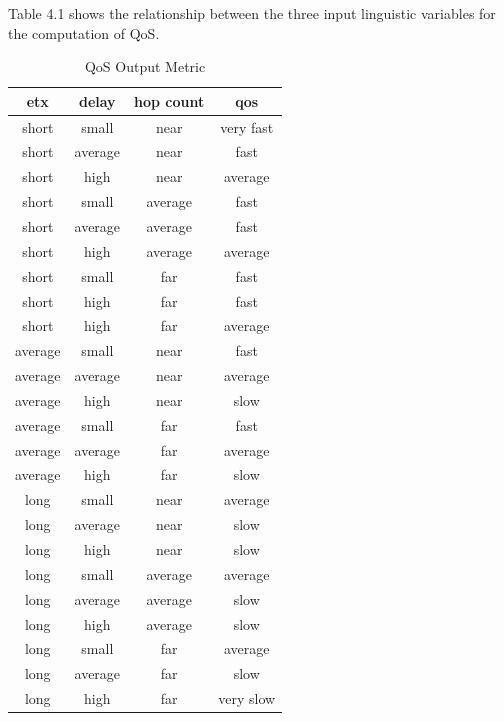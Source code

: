 \noindent Table 4.1 shows the relationship between the three input linguistic variables for the computation of QoS.
\begin{table}[!ht]
\centering
\begin{tabular}{||c|c|c|c||}
\hline\hline
etx & delay & hop count & qos\\
\hline\hline
short & small & near & very fast\\
\hline
short & average & near & fast\\
\hline
short & high & near & average\\
\hline
short & small & average & fast\\
\hline
short & average & average & fast\\
\hline
short & high & average & average\\
\hline
short & small & far & fast\\
\hline
short & high & far & fast\\
\hline
short & high & far & average\\
\hline
average & small & near & fast\\
\hline
average & average & near & average\\
\hline
average & high & near & slow\\
\hline
average & small & far & fast\\
\hline
average & average & far & average\\
\hline
average & high & far & slow\\
\hline
long & small & near & average\\
\hline
long & average & near & slow\\
\hline
long & high & near & slow\\
\hline
long & small & average & average\\
\hline
long & average & average & slow\\
\hline
long & high & average & slow\\
\hline
long & small & far & average\\
\hline
long & average & far & slow\\
\hline
long & high & far & very slow\\
\hline\hline
  \end{tabular}
  \caption{QoS Output Metric}
\end{table}


